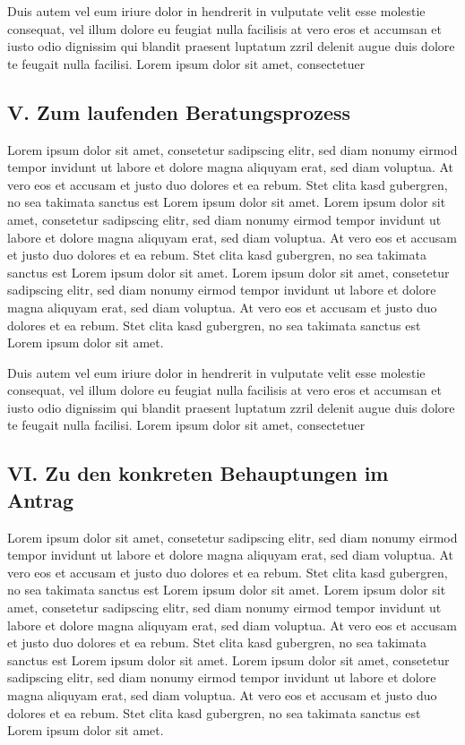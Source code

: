 \documentclass[
  12pt,
  a4paper,
]{article}
\begin{document}
Duis autem vel eum iriure dolor in hendrerit in vulputate velit esse
molestie consequat, vel illum dolore eu feugiat nulla facilisis at vero
eros et accumsan et iusto odio dignissim qui blandit praesent luptatum
zzril delenit augue duis dolore te feugait nulla facilisi. Lorem ipsum
dolor sit amet, consectetuer

\subsection{V. Zum laufenden
Beratungsprozess}\label{v.-zum-laufenden-beratungsprozess}

Lorem ipsum dolor sit amet, consetetur sadipscing elitr, sed diam nonumy
eirmod tempor invidunt ut labore et dolore magna aliquyam erat, sed diam
voluptua. At vero eos et accusam et justo duo dolores et ea rebum. Stet
clita kasd gubergren, no sea takimata sanctus est Lorem ipsum dolor sit
amet. Lorem ipsum dolor sit amet, consetetur sadipscing elitr, sed diam
nonumy eirmod tempor invidunt ut labore et dolore magna aliquyam erat,
sed diam voluptua. At vero eos et accusam et justo duo dolores et ea
rebum. Stet clita kasd gubergren, no sea takimata sanctus est Lorem
ipsum dolor sit amet. Lorem ipsum dolor sit amet, consetetur sadipscing
elitr, sed diam nonumy eirmod tempor invidunt ut labore et dolore magna
aliquyam erat, sed diam voluptua. At vero eos et accusam et justo duo
dolores et ea rebum. Stet clita kasd gubergren, no sea takimata sanctus
est Lorem ipsum dolor sit amet.

Duis autem vel eum iriure dolor in hendrerit in vulputate velit esse
molestie consequat, vel illum dolore eu feugiat nulla facilisis at vero
eros et accumsan et iusto odio dignissim qui blandit praesent luptatum
zzril delenit augue duis dolore te feugait nulla facilisi. Lorem ipsum
dolor sit amet, consectetuer

\subsection{VI. Zu den konkreten Behauptungen im
Antrag}\label{vi.-zu-den-konkreten-behauptungen-im-antrag}

Lorem ipsum dolor sit amet, consetetur sadipscing elitr, sed diam nonumy
eirmod tempor invidunt ut labore et dolore magna aliquyam erat, sed diam
voluptua. At vero eos et accusam et justo duo dolores et ea rebum. Stet
clita kasd gubergren, no sea takimata sanctus est Lorem ipsum dolor sit
amet. Lorem ipsum dolor sit amet, consetetur sadipscing elitr, sed diam
nonumy eirmod tempor invidunt ut labore et dolore magna aliquyam erat,
sed diam voluptua. At vero eos et accusam et justo duo dolores et ea
rebum. Stet clita kasd gubergren, no sea takimata sanctus est Lorem
ipsum dolor sit amet. Lorem ipsum dolor sit amet, consetetur sadipscing
elitr, sed diam nonumy eirmod tempor invidunt ut labore et dolore magna
aliquyam erat, sed diam voluptua. At vero eos et accusam et justo duo
dolores et ea rebum. Stet clita kasd gubergren, no sea takimata sanctus
est Lorem ipsum dolor sit amet.
\end{document}
